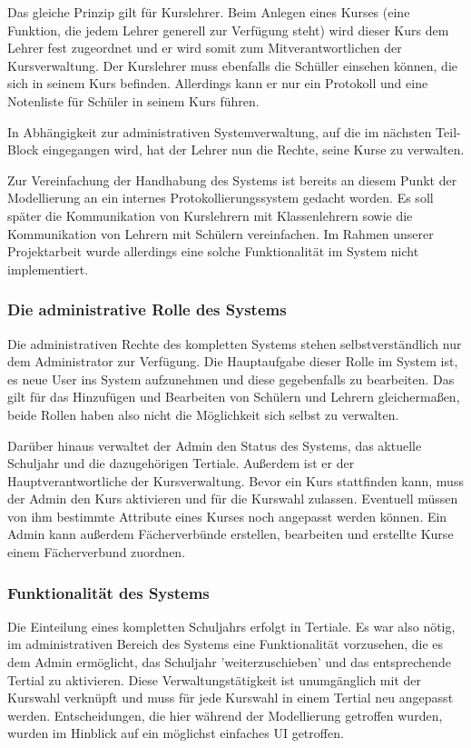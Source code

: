 Das gleiche Prinzip gilt für Kurslehrer. 
Beim Anlegen eines Kurses (eine Funktion, die jedem Lehrer generell zur Verfügung steht) wird dieser Kurs dem Lehrer fest zugeordnet und er wird somit zum Mitverantwortlichen der Kursverwaltung. 
Der Kurslehrer muss ebenfalls die Schüller einsehen können, die sich in seinem Kurs befinden. Allerdings kann er nur ein Protokoll und eine Notenliste für Schüler in seinem Kurs führen.

In Abhängigkeit zur administrativen Systemverwaltung, auf die im nächsten Teil-Block eingegangen wird, hat der Lehrer nun die Rechte, seine Kurse zu verwalten.

Zur Vereinfachung der Handhabung des Systems ist bereits an diesem Punkt der Modellierung an ein internes Protokollierungssystem gedacht worden. 
Es soll später die Kommunikation von Kurslehrern mit Klassenlehrern sowie die Kommunikation von Lehrern mit Schülern vereinfachen.
Im Rahmen unserer Projektarbeit wurde allerdings eine solche Funktionalität im System nicht implementiert.

\subsubsection{Die administrative Rolle des Systems}

Die administrativen Rechte des kompletten Systems stehen selbstverständlich nur dem Administrator zur Verfügung. Die Hauptaufgabe dieser Rolle im System ist, es neue User ins System aufzunehmen und diese gegebenfalls zu bearbeiten.
Das gilt für das Hinzufügen und Bearbeiten von Schülern und Lehrern gleichermaßen, beide Rollen haben also nicht die Möglichkeit sich selbst zu verwalten.

Darüber hinaus verwaltet der Admin den Status des Systems, das aktuelle Schuljahr und die dazugehörigen Tertiale. Außerdem ist er der Hauptverantwortliche der Kursverwaltung.
Bevor ein Kurs stattfinden kann, muss der Admin den Kurs aktivieren und für die Kurswahl zulassen. Eventuell müssen von ihm bestimmte Attribute eines Kurses noch angepasst werden können.
Ein Admin kann außerdem Fächerverbünde erstellen, bearbeiten und erstellte Kurse einem Fächerverbund zuordnen.

\subsubsection{Funktionalität des Systems}

Die Einteilung eines kompletten Schuljahrs erfolgt in Tertiale. 
Es war also nötig, im administrativen Bereich des Systems eine Funktionalität vorzusehen, die es dem Admin ermöglicht, das Schuljahr 'weiterzuschieben' und das entsprechende Tertial zu aktivieren.
Diese Verwaltungstätigkeit ist unumgänglich mit der Kurswahl verknüpft und muss für jede Kurswahl in einem Tertial neu angepasst werden. 
Entscheidungen, die hier während der Modellierung getroffen wurden, wurden im Hinblick auf ein möglichst einfaches \ac{UI} getroffen.

